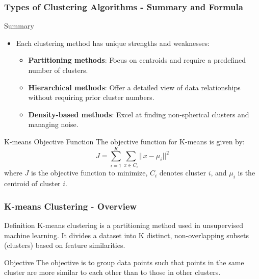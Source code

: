 \documentclass[aspectratio=169]{beamer}
\begin{document}
\begin{frame}[fragile]
    \frametitle{Types of Clustering Algorithms - Summary and Formula}
    \begin{block}{Summary}
        \begin{itemize}
            \item Each clustering method has unique strengths and weaknesses:
            \begin{itemize}
                \item \textbf{Partitioning methods}: Focus on centroids and require a predefined number of clusters.
                \item \textbf{Hierarchical methods}: Offer a detailed view of data relationships without requiring prior cluster numbers.
                \item \textbf{Density-based methods}: Excel at finding non-spherical clusters and managing noise.
            \end{itemize}
        \end{itemize}
    \end{block}

    \begin{block}{K-means Objective Function}
        The objective function for K-means is given by:
        \begin{equation}
            J = \sum_{i=1}^{K} \sum_{x \in C_i} ||x - \mu_i||^2
        \end{equation}
        where $J$ is the objective function to minimize, $C_i$ denotes cluster $i$, and $\mu_i$ is the centroid of cluster $i$.
    \end{block}
\end{frame}

\begin{frame}[fragile]
    \frametitle{K-means Clustering - Overview}
    \begin{block}{Definition}
        K-means clustering is a partitioning method used in unsupervised machine learning. It divides a dataset into K distinct, non-overlapping subsets (clusters) based on feature similarities.
    \end{block}
    \begin{block}{Objective}
        The objective is to group data points such that points in the same cluster are more similar to each other than to those in other clusters.
    \end{block}
\end{frame}
\end{document}
